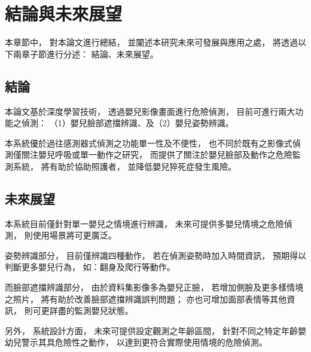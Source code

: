 \documentclass[class=NCU_thesis, crop=false]{standalone}
\begin{document}
\chapter{結論與未來展望}
本章節中，
對本論文進行總結，
並闡述本研究未來可發展與應用之處，
將透過以下兩章子節進行分述：
結論、未來展望。

\section{結論}
本論文基於深度學習技術，
透過嬰兒影像畫面進行危險偵測，
目前可進行兩大功能之偵測：
（1）嬰兒臉部遮擋辨識、及（2）嬰兒姿勢辨識。

本系統優於過往感測器式偵測之功能單一性及不便性，
也不同於既有之影像式偵測僅關注嬰兒呼吸或單一動作之研究，
而提供了關注於嬰兒臉部及動作之危險監測系統，
將有助於協助照護者，
並降低嬰兒猝死症發生風險。

\newpage

\section{未來展望}
本系統目前僅針對單一嬰兒之情境進行辨識，
未來可提供多嬰兒情境之危險偵測，
則使用場景將可更廣泛。

姿勢辨識部分，
目前僅辨識四種動作，
若在偵測姿勢時加入時間資訊，
預期得以判斷更多嬰兒行為，
如：翻身及爬行等動作。

而臉部遮擋辨識部分，
由於資料集影像多為嬰兒正臉，
若增加側臉及更多樣情境之照片，
將有助於改善臉部遮擋辨識誤判問題；
亦也可增加面部表情等其他資訊，
則可更詳盡的監測嬰兒狀態。

另外，
系統設計方面，
未來可提供設定觀測之年齡區間，
針對不同之特定年齡嬰幼兒警示其具危險性之動作，
以達到更符合實際使用情境的危險偵測。
\end{document}
